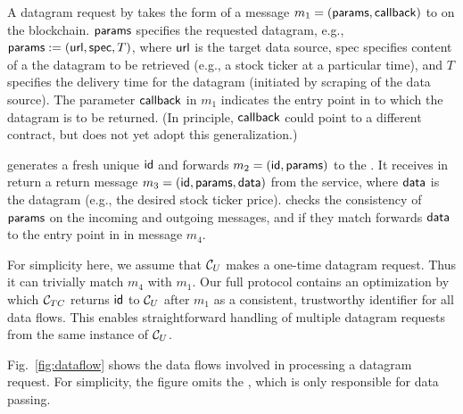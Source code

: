 A datagram request by \reqcont takes the form of a message $m_1 = ({\sf params}, {\sf callback})$ to \tcont on the blockchain. ${\sf params}$ specifies the requested datagram, e.g., ${\sf params} := ({{\sf url}}, {\sf spec}, T)$, where ${{\sf url}}$ is the target data source, {\sf spec} specifies content of a the datagram to be retrieved (e.g., a stock ticker at a particular time), and $T$ specifies the delivery time for the datagram (initiated by scraping of the data source). The parameter ${\sf callback}$ in $m_1$ indicates the entry point in \reqcont to which the datagram is to be returned. (In principle, ${\sf callback}$ could point to a different contract, but \tc does not yet adopt this generalization.) 

\tcont generates a fresh unique ${\sf id}$ and forwards $m_2 = ({\sf id}, {\sf params})$ to the \encname. It receives in return a return message $m_3 = ({\sf id}, {\sf params}, {\sf data})$ from the \tc service, where ${\sf data}$ is the datagram (e.g., the desired stock ticker price). \tcont checks the consistency of ${\sf params}$ on the incoming and outgoing messages, and if they match forwards ${\sf data}$ to the entry point \dgcallback in \reqcont in message $m_4$.

For simplicity here, we assume that $\reqcont$ makes a one-time datagram request. Thus it can trivially match $m_4$ with $m_1$. Our full protocol contains an optimization by which $\tcont$ returns ${\sf id}$ to $\reqcont$ after $m_1$ as a consistent, trustworthy identifier for all data flows. This enables straightforward handling of multiple datagram requests from the same instance of $\reqcont$.

Fig.~\ref{fig:dataflow} shows the data flows involved in processing a datagram request. For simplicity, the figure omits the \medname, which is only responsible for data passing.


